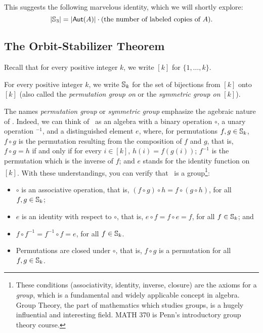 This suggests the following marvelous identity, which we will shortly explore:
\begin{equation}\label{ose-eq}
\mbox{$|\mbox{$\mathbb{S}_{3}$}|$}=\mbox{$|\mbox{$\mathsf{Aut}(A)$}|$}\cdot (\mbox{the number of labeled copies of }A).
\end{equation}

\subsection*{The Orbit-Stabilizer Theorem}

Recall that for every positive integer $k$, we write $[k]$ for $\{1,\ldots,k\}$.

\begin{definition}
For every positive integer $k$, we write $\mbox{$\mathbb{S}_{k}$}$ for the set of bijections from $[k]$ onto $[k]$ (also called the \emph{permutation group on} or the \emph{symmetric group on} $[k]$).
\end{definition}

The names \emph{permutation group} or \emph{symmetric group} emphasize the agebraic nature of . Indeed, we can think of \ as an algebra with a binary operation $\circ$, a unary operation $^{-1}$, and a distinguished element $e$, where, for permutations $f,g\in\mbox{$\mathbb{S}_{k}$}$, $f\circ g$ is the permutation resulting from the composition of $f$ and $g$, that is, $f\circ g =h$ if and only if for every $i\in [k]$, $h(i) = f(g(i))$; $f^{-1}$ is the permutation which is the inverse of $f$; and $e$ stands for the identity function on $[k]$. With these understandings, you can verify that \ is a group\footnote{These conditions (associativity, identity, inverse, closure) are the axioms for a \emph{group}, which is a fundamental and widely applicable concept in algebra. Group Theory, the part of mathematics which studies groups, is a hugely influential and interesting field. MATH 370 is Penn's introductory group theory course. }: 

\begin{itemize}
\item   
$\circ$ is an associative operation, that is, $(f\circ g)\circ h= f\circ (g\circ h)$, for all $f,g\in\mbox{$\mathbb{S}_{k}$}$;
\item
 $e$ is an identity with respect to $\circ$, that is, $e\circ f = f\circ e = f$, for all $f\in\mbox{$\mathbb{S}_{k}$}$; and 
 \item
 $f\circ f^{-1} = f^{-1}\circ f = e$, for all $f\in\mbox{$\mathbb{S}_{k}$}$.
 \item Permutations are closed under $\circ$, that is, $f \circ g$ is a permutation for all $f, g \in \mbox{$\mathbb{S}_{k}$}$. 
\end{itemize} 

